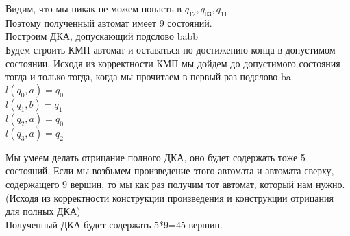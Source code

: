 \documentclass[a4paper,12pt]{article}
\begin{document}
Видим, что мы никак не можем попасть в $q_{12},q_{03},q_{11}$\\
Поэтому полученный автомат имеет 9 состояний. \\
Построим ДКА, допускающий подслово babb\\
Будем строить КМП-автомат и оставаться по достижению конца в допустимом состоянии. Исходя из корректности КМП мы дойдем до допустимого состояния тогда и только тогда, когда мы прочитаем в первый раз подслово ba.\\
$l(q_0,a)=q_0$\\
$l(q_1,b)=q_1$\\
$l(q_2,a)=q_0$\\
$l(q_3,a)=q_2$\\



\begin{center} 
\end{center}

Мы умеем делать отрицание полного ДКА, оно будет содержать тоже 5 состояний. Если мы возбьмем произведение этого автомата и автомата сверху, содержащего 9 вершин, то мы как раз получим тот автомат, который нам нужно.(Исходя из корректности конструкции произведения и конструкции отрицания для полных ДКА)\\
Полученный ДКА будет содержать 5*9=45 вершин.\\
\end{document}
